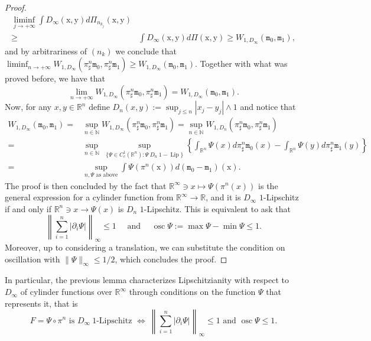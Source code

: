 \documentclass[10pt,leqno]{amsart}
\numberwithin{equation}{section}
\newcommand{\R}{\mathbb{R}}
\newcommand{\N}{\mathbb{N}}
\begin{document}
\begin{proof}
\begin{align*}
        \liminf_{j\to+\infty} \int D_\infty(\mathrm{x},\mathrm{y}) d\Pi_{n_{k_j}}(\mathrm{x},\mathrm{y}) 
        \\
        \geq & 
        \int D_\infty(\mathrm{x},\mathrm{y}) d\Pi(\mathrm{x},\mathrm{y}) \geq W_{1,D_\infty}(\mathtt{m}_0,\mathtt{m}_1),
    \end{align*}
    and by arbitrariness of $(n_k)$ we conclude that $\liminf_{n\to+\infty} W_{1,D_\infty}(\pi^{n}_\sharp \mathtt{m}_0,\pi^{n}_\sharp \mathtt{m}_1) 
        \geq W_{1,D_\infty}(\mathtt{m}_0,\mathtt{m}_1) 
        $. Together with what was proved before, we have that 
        \begin{equation}
            \lim_{n\to+\infty} W_{1,D_\infty}(\pi^{n}_\sharp \mathtt{m}_0,\pi^{n}_\sharp \mathtt{m}_1) 
        = W_{1,D_\infty}(\mathtt{m}_0,\mathtt{m}_1) .
        \end{equation}
        Now, for any $x,y\in \R^n$ define $D_n(x,y) := \sup_{j\leq n} |x_j-y_j|\wedge 1$ and notice that 
        \begin{align*}
            W_{1,D_\infty}(\mathtt{m}_0,\mathtt{m}_1) 
            = & 
            \sup_{n\in \N} W_{1,D_\infty}(\pi^n_\sharp \mathtt{m}_0,\pi^n_\sharp \mathtt{m}_1)
            = 
            \sup_{n\in \N} W_{1,D_n}(\pi^n_\sharp \mathtt{m}_0,\pi^n_\sharp \mathtt{m}_1)
            \\
            = &
            \sup_{n\in \N} \ \sup_{\{\Psi\in C_c^1(\R^n): \Psi\  D_n \ 1-\operatorname{Lip}\}} \left\{ \int_{\R^n} \Psi(x) d\pi^n_\sharp \mathtt{m}_0(x) - \int_{\R^n} \Psi(y) d\pi^n_\sharp \mathtt{m}_1(y) \right\}
            \\
            = & \sup_{n, \Psi \text{ as above}} \int \Psi(\pi^n(\mathrm{x})) d(\mathtt{m}_0 - \mathtt{m}_1)(\mathrm{x}).
        \end{align*}
        The proof is then concluded by the fact that $\R^\infty \ni x \mapsto \Psi(\pi^n(x))$ is the general expression for a cylinder function from $\R^\infty\to\R$, and it is $D_\infty$ $1$-Lipschitz if and only if $\R^n \ni x \to \Psi(x)$ is $D_n$ $1$-Lipschitz. This is equivalent to ask that 
        \[\left\|\sum_{i=1}^n |\partial_i\Psi|\right\|_\infty  \leq 1 \quad \text{ and }\quad \operatorname{osc}\Psi:= \max \Psi - \min \Psi \leq 1.\]
        Moreover, up to considering a translation, we can substitute the condition on oscillation with $\|\Psi\|_\infty\leq 1/2$, which concludes the proof.
\end{proof}

In particular, the previous lemma characterizes Lipschitzianity with respect to $D_\infty$ of cylinder functions over $\R^\infty$ through conditions on the function $\Psi$ that represents it, that is
\[F = \Psi \circ \pi^n\text{ is }D_\infty \ 1\text{-Lipschitz }\iff \ \left\|\sum_{i=1}^n |\partial_i\Psi|\right\|_\infty \leq  1 \text{ and } \operatorname{osc} \Psi \leq 1.  \]
\end{document}
